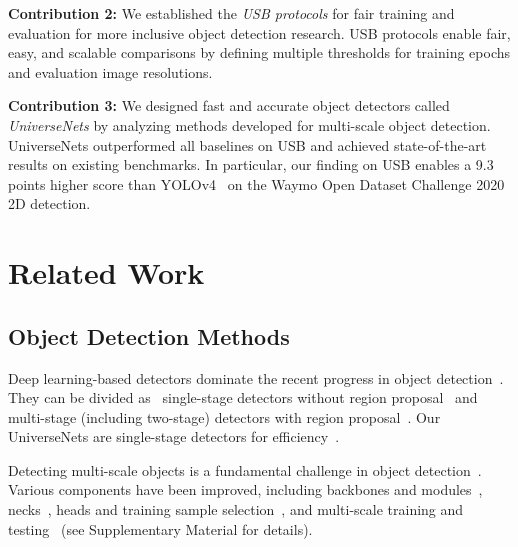 \documentclass[10pt,twocolumn,letterpaper]{article}
\newcommand{\Univs}{UniverseNets\xspace}
\def\AppendixSection{Supplementary Material\xspace}
\begin{document}
\textbf{Contribution 2:}
We established the \textit{USB protocols} for fair training and evaluation
for more inclusive object detection research.
USB protocols enable fair, easy, and scalable comparisons
by defining multiple thresholds for training epochs and evaluation image resolutions.

\textbf{Contribution 3:}
We designed fast and accurate object detectors called \textit{\Univs}
by analyzing methods developed for multi-scale object detection.
\Univs outperformed all baselines on USB
and achieved state-of-the-art results on existing benchmarks.
In particular,
our finding on USB enables a 9.3 points higher score than YOLOv4~\cite{YOLOv4_2020}
on the Waymo Open Dataset Challenge 2020 2D detection.




\section{Related Work}
\label{sec:related_work}



\subsection{Object Detection Methods}

Deep learning-based detectors dominate the recent progress in object detection~\cite{object_detection_survey_Liu_IJCV2020}.
They can be divided as~\cite{object_detection_survey_Liu_IJCV2020, MMDetection, Faster_R-CNN_NIPS2015}
single-stage detectors without region proposal~\cite{YOLO_CVPR2016, SSD_ECCV2016, RetinaNet_ICCV2017} and
multi-stage (including two-stage) detectors with region proposal~\cite{Faster_R-CNN_NIPS2015, FPN_CVPR2017, Cascade_R-CNN_CVPR2018}.
Our \Univs are single-stage detectors for efficiency~\cite{GFL_NeurIPS2020, EfficientDet_CVPR2020, YOLOv4_2020, SpeedAccuracyTradeOffs_CVPR2017}.

Detecting multi-scale objects is a fundamental challenge in object detection~\cite{object_detection_survey_Liu_IJCV2020, UniversalObjectDetection_ZhaoweiCai_2019}.
Various components have been improved, including
backbones and modules~\cite{Inception_CVPR2015, ResNet_CVPR2016, BagOfTricks_Classification_CVPR2019, Res2Net_TPAMI2020, DCN_ICCV2017},
necks~\cite{FPN_CVPR2017, SEPC_CVPR2020, EfficientDet_CVPR2020},
heads and training sample selection~\cite{Faster_R-CNN_NIPS2015, SSD_ECCV2016, ATSS_CVPR2020}, and
multi-scale training and testing~\cite{Rowley_PAMI1998, SNIP_Singh_CVPR2018, ATSS_CVPR2020}
(see \AppendixSection for details).
\end{document}
